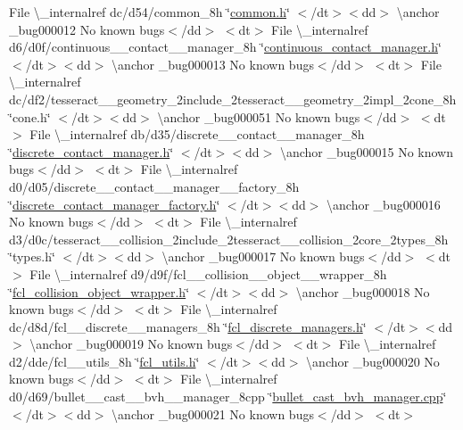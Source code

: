 \begin{DoxyRefList}
\+File \textbackslash{}\+\_\+internalref dc/d54/common\+\_\+8h \char`\"{}\mbox{\hyperlink{common_8h}{common.\+h}}\char`\"{} $<$/dt$>$$<$dd$>$ \textbackslash{}anchor \+\_\+bug000012 No known bugs$<$/dd$>$ $<$dt$>$
\+File \textbackslash{}\+\_\+internalref d6/d0f/continuous\+\_\+\+\_\+contact\+\_\+\+\_\+manager\+\_\+8h \char`\"{}\mbox{\hyperlink{continuous__contact__manager_8h}{continuous\+\_\+contact\+\_\+manager.\+h}}\char`\"{} $<$/dt$>$$<$dd$>$ \textbackslash{}anchor \+\_\+bug000013 No known bugs$<$/dd$>$ $<$dt$>$
\+File \textbackslash{}\+\_\+internalref dc/df2/tesseract\+\_\+\+\_\+geometry\+\_\+2include\+\_\+2tesseract\+\_\+\+\_\+geometry\+\_\+2impl\+\_\+2cone\+\_\+8h \char`\"{}cone.\+h\char`\"{} $<$/dt$>$$<$dd$>$ \textbackslash{}anchor \+\_\+bug000051 No known bugs$<$/dd$>$ $<$dt$>$
\+File \textbackslash{}\+\_\+internalref db/d35/discrete\+\_\+\+\_\+contact\+\_\+\+\_\+manager\+\_\+8h \char`\"{}\mbox{\hyperlink{discrete__contact__manager_8h}{discrete\+\_\+contact\+\_\+manager.\+h}}\char`\"{} $<$/dt$>$$<$dd$>$ \textbackslash{}anchor \+\_\+bug000015 No known bugs$<$/dd$>$ $<$dt$>$
\+File \textbackslash{}\+\_\+internalref d0/d05/discrete\+\_\+\+\_\+contact\+\_\+\+\_\+manager\+\_\+\+\_\+factory\+\_\+8h \char`\"{}\mbox{\hyperlink{discrete__contact__manager__factory_8h}{discrete\+\_\+contact\+\_\+manager\+\_\+factory.\+h}}\char`\"{} $<$/dt$>$$<$dd$>$ \textbackslash{}anchor \+\_\+bug000016 No known bugs$<$/dd$>$ $<$dt$>$
\+File \textbackslash{}\+\_\+internalref d3/d0c/tesseract\+\_\+\+\_\+collision\+\_\+2include\+\_\+2tesseract\+\_\+\+\_\+collision\+\_\+2core\+\_\+2types\+\_\+8h \char`\"{}types.\+h\char`\"{} $<$/dt$>$$<$dd$>$ \textbackslash{}anchor \+\_\+bug000017 No known bugs$<$/dd$>$ $<$dt$>$
\+File \textbackslash{}\+\_\+internalref d9/d9f/fcl\+\_\+\+\_\+collision\+\_\+\+\_\+object\+\_\+\+\_\+wrapper\+\_\+8h \char`\"{}\mbox{\hyperlink{fcl__collision__object__wrapper_8h}{fcl\+\_\+collision\+\_\+object\+\_\+wrapper.\+h}}\char`\"{} $<$/dt$>$$<$dd$>$ \textbackslash{}anchor \+\_\+bug000018 No known bugs$<$/dd$>$ $<$dt$>$
\+File \textbackslash{}\+\_\+internalref dc/d8d/fcl\+\_\+\+\_\+discrete\+\_\+\+\_\+managers\+\_\+8h \char`\"{}\mbox{\hyperlink{fcl__discrete__managers_8h}{fcl\+\_\+discrete\+\_\+managers.\+h}}\char`\"{} $<$/dt$>$$<$dd$>$ \textbackslash{}anchor \+\_\+bug000019 No known bugs$<$/dd$>$ $<$dt$>$
\+File \textbackslash{}\+\_\+internalref d2/dde/fcl\+\_\+\+\_\+utils\+\_\+8h \char`\"{}\mbox{\hyperlink{fcl__utils_8h}{fcl\+\_\+utils.\+h}}\char`\"{} $<$/dt$>$$<$dd$>$ \textbackslash{}anchor \+\_\+bug000020 No known bugs$<$/dd$>$ $<$dt$>$
\+File \textbackslash{}\+\_\+internalref d0/d69/bullet\+\_\+\+\_\+cast\+\_\+\+\_\+bvh\+\_\+\+\_\+manager\+\_\+8cpp \char`\"{}\mbox{\hyperlink{bullet__cast__bvh__manager_8cpp}{bullet\+\_\+cast\+\_\+bvh\+\_\+manager.\+cpp}}\char`\"{} $<$/dt$>$$<$dd$>$ \textbackslash{}anchor \+\_\+bug000021 No known bugs$<$/dd$>$ $<$dt$>$

\end{DoxyRefList}
